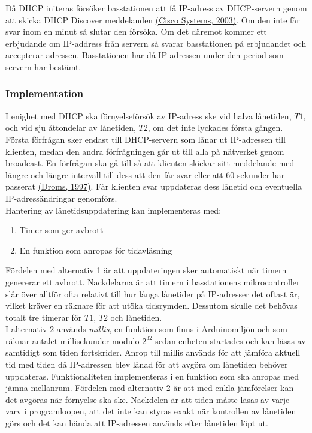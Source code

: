 \documentclass[a4paper,11pt]{article}
\begin{document}
Då DHCP initeras försöker basstationen att få IP-adress av DHCP-servern genom att skicka DHCP Discover meddelanden \hyperref[cisco]{(Cisco Systems, 2003)}. Om den inte får svar inom en minut så slutar den försöka. Om det däremot kommer ett erbjudande om IP-address från servern så svarar basstationen på erbjudandet och accepterar adressen. Basstationen har då IP-adressen under den period som servern har bestämt.    

\subsubsection{Implementation}
I enighet med DHCP ska förnyelseförsök av IP-adress ske vid halva lånetiden, $T1$, och vid sju åttondelar av lånetiden, $T2$, om det inte lyckades första gången. Första förfrågan sker endast till DHCP-servern som lånar ut IP-adressen till klienten, medan den andra förfrågningen går ut till alla på nätverket genom broadcast. En förfrågan ska gå till så att klienten skickar sitt meddelande med längre och längre intervall till dess att den får svar eller att 60 sekunder har passerat \hyperref[droms]{(Droms, 1997)}. Får klienten svar uppdateras dess lånetid och eventuella IP-adressändringar genomförs.\\

Hantering av lånetidsuppdatering kan implementeras med:

	\begin{enumerate}
	\item Timer som ger avbrott
    \item En funktion som anropas för tidavläsning
	\end{enumerate}
	
Fördelen med alternativ 1 är att uppdateringen sker automatiskt när timern genererar ett avbrott. Nackdelarna är att timern i basstationens mikrocontroller slår över alltför ofta relativt till hur långa lånetider på IP-adresser det oftast är, vilket kräver en räknare för att utöka tidsrymden. Dessutom skulle det behövas totalt tre timerar för $T1$, $T2$ och lånetiden.\\

I alternativ 2 används {\it millis}, en funktion som finns i Arduinomiljön och som räknar antalet millisekunder modulo $2^{32}$ sedan enheten startades och kan läsas av samtidigt som tiden fortskrider. Anrop till millis används för att jämföra aktuell tid med tiden då IP-adressen blev lånad för att avgöra om lånetiden behöver uppdateras. Funktionaliteten implementeras i en funktion som ska anropas med jämna mellanrum. Fördelen med alternativ 2 är att med enkla jämförelser kan det avgöras när förnyelse ska ske. Nackdelen är att tiden måste läsas av varje varv i programloopen, att det inte kan styras exakt när kontrollen av lånetiden görs och det kan hända att IP-adressen används efter lånetiden löpt ut.\\
\end{document}
